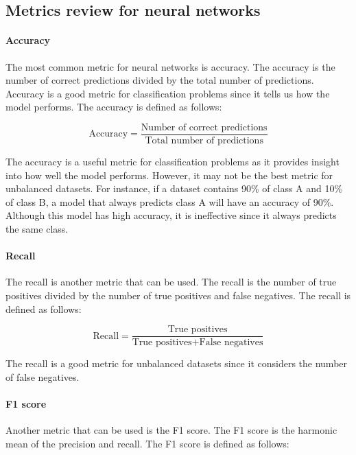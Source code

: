 \subsection{Metrics review for neural networks}

\paragraph{Accuracy}
The most common metric for neural networks is accuracy. The accuracy is the number of correct predictions divided by the total number of predictions. Accuracy is a good metric for classification problems since it tells us how the model performs. The accuracy is defined as follows:

\begin{equation}
    \text{Accuracy} = \frac{\text{Number of correct predictions}}{\text{Total number of predictions}}
\end{equation}

The accuracy is a useful metric for classification problems as it provides insight into how well the model performs. However, it may not be the best metric for unbalanced datasets. For instance, if a dataset contains 90\% of class A and 10\% of class B, a model that always predicts class A will have an accuracy of 90\%. Although this model has high accuracy, it is ineffective since it always predicts the same class.

\paragraph{Recall}
The recall is another metric that can be used. The recall is the number of true positives divided by the number of true positives and false negatives. The recall is defined as follows:

\begin{equation}
    \text{Recall} = \frac{\text{True positives}}{\text{True positives} + \text{False negatives}}
\end{equation}

The recall is a good metric for unbalanced datasets since it considers the number of false negatives.

\paragraph{F1 score}
Another metric that can be used is the F1 score. The F1 score is the harmonic mean of the precision and recall. The F1 score is defined as follows:

